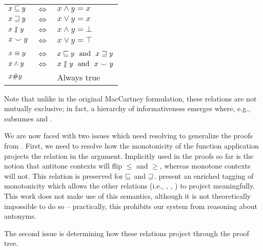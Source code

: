 \documentclass[11pt,a4paper]{article}
\begin{document}
\begin{center}
\begin{tabular}{lcl}
  $x \sqsubseteq y$ & $\Leftrightarrow$ & $x \land y = x$ \\
  $x \sqsupseteq y$ & $\Leftrightarrow$ & $x \lor y = x$ \\
  $x \downharpoonleft\hspace{-0.30em}\upharpoonright y$ & $\Leftrightarrow$ & $x \land y = \bot$ \\
  $x \smile y$ & $\Leftrightarrow$ & $x \lor y = \top$ \\
  \vspace{-0.5em} & & \\
  $x \equiv y$ & $\Leftrightarrow$ & $x \sqsubseteq y~~\textrm{and}~~x \sqsupseteq y$ \\
  $x \wedge y$ & $\Leftrightarrow$ & $x \downharpoonleft\hspace{-0.30em}\upharpoonright y~~\textrm{and}~~x \smile y$ \\
  $x \# y$ & & Always true
\end{tabular}
\end{center}

Note that unlike in the original MacCartney formulation, these relations
  are not mutually exclusive; in fact, a hierarchy of informativeness
  emerges where, e.g., \negate subsumes \alternate and \cover.

We are now faced with two issues which need resolving to generalize
  the proofs from .
First, we need to resolve how the monotonicity of the function application
  projects the relation in the argument.
Implicitly used in the proofs so far is the notion that antitone contexts
  will flip $\leq$ and $\geq$, whereas monotone contexts will not.
This relation is preserved for $\sqsubseteq$ and $\sqsupseteq$.
\citet{key:2012icard-natlog} present an enriched tagging of 
  monotonicity which allows the other relations (i.e.,
  \negateS, \alternateS, \coverS) to project meaningfully.
This work does not make use of this semantics, although it is not
  theoretically impossible to do so -- practically, this prohibits
  our system from reasoning about antonyms.

The second issue is determining how these relations project through
  the proof tree.



\end{document}
